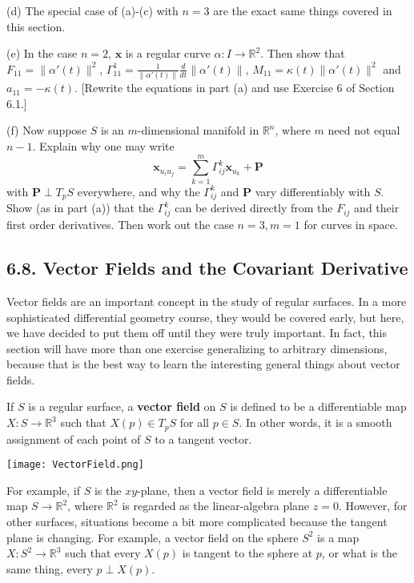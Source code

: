 \documentclass[leqno]{book}
\begin{document}
\begin{enumerate}
(d) The special case of (a)-(c) with $n=3$ are the exact same things covered in this section.

(e) In the case $n=2$, $\mathbf x$ is a regular curve $\alpha:I\to\mathbb R^2$.  Then show that $F_{11}=\|\alpha'(t)\|^2$, $\Gamma_{11}^1=\frac 1{\|\alpha'(t)\|}\frac d{dt}\|\alpha'(t)\|$, $M_{11}=\kappa(t)\|\alpha'(t)\|^2$ and $a_{11}=-\kappa(t)$.  [Rewrite the equations in part (a) and use Exercise 6 of Section 6.1.]

(f) Now suppose $S$ is an $m$-dimensional manifold in $\mathbb R^n$, where $m$ need not equal $n-1$.  Explain why one may write
$$\mathbf x_{u_iu_j}=\sum_{k=1}^m\Gamma_{ij}^k\mathbf x_{u_k}+\mathbf P$$
with $\mathbf P\perp T_pS$ everywhere, and why the $\Gamma_{ij}^k$ and $\mathbf P$ vary differentiably with $S$.  Show (as in part (a)) that the $\Gamma_{ij}^k$ can be derived directly from the $F_{ij}$ and their first order derivatives.  Then work out the case $n=3,m=1$ for curves in space.
\end{enumerate}

\subsection*{6.8. Vector Fields and the Covariant Derivative}
Vector fields are an important concept in the study of regular surfaces.  In a more sophisticated differential geometry course, they would be covered early, but here, we have decided to put them off until they were truly important.  In fact, this section will have more than one exercise generalizing to arbitrary dimensions, because that is the best way to learn the interesting general things about vector fields.

If $S$ is a regular surface, a \textbf{vector field} on $S$ is defined to be a differentiable map $X:S\to\mathbb R^3$ such that $X(p)\in T_pS$ for all $p\in S$.  In other words, it is a smooth assignment of each point of $S$ to a tangent vector.
\begin{center}
\texttt{[image: VectorField.png]}
\end{center}
For example, if $S$ is the $xy$-plane, then a vector field is merely a differentiable map $S\to\mathbb R^2$, where $\mathbb R^2$ is regarded as the linear-algebra plane $z=0$.  However, for other surfaces, situations become a bit more complicated because the tangent plane is changing.  For example, a vector field on the sphere $S^2$ is a map $X:S^2\to\mathbb R^3$ such that every $X(p)$ is tangent to the sphere at $p$, or what is the same thing, every $p\perp X(p)$.
\end{document}

